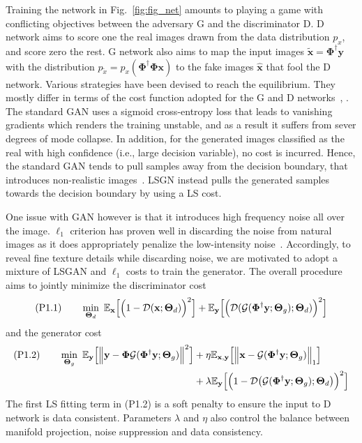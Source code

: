 \documentclass{journal}
\def \cD {\mathcal{D}}
\def \cG {\mathcal{G}}
\def \bPhi {\boldsymbol{\Phi}}
\def \bTheta {\boldsymbol{\Theta}}
\def \by {\mathbf{y}}
\def \bx {\mathbf{x}}
\begin{document}
Training the network in Fig.~\ref{fig:fig_net} amounts to playing a game with conflicting objectives between the adversary G and the discriminator D. D network aims to score one the real images drawn from the data distribution $p_{x}$, and score zero the rest. G network also aims to map the input images $\tilde{\bx}=\bPhi^{\dagger}\by$ with the distribution $p_{\tilde{x}}=p_{x}(\bPhi^{\dagger}\bPhi \bx)$ to the fake images $\hat{\bx}$ that fool the D network. Various strategies have been devised to reach the equilibrium. They mostly differ in terms of the cost function adopted for the G and D networks~\cite{gan-goodfellow2014}, \cite{lsgan2017}. The standard GAN uses a sigmoid cross-entropy loss that leads to vanishing gradients which renders the training unstable, and as a result it suffers from sever degrees of mode collapse. In addition, for the generated images classified as the real with high confidence (i.e., large decision variable), no cost is incurred. Hence, the standard GAN tends to pull samples away from the decision boundary, that introduces non-realistic images~\cite{lsgan2017}. LSGN instead pulls the generated samples towards the decision boundary by using a LS cost. 

One issue with GAN however is that it introduces high frequency noise all over the image. $\ell_1$ criterion has proven well in discarding the noise from natural images as it does appropriately penalize the low-intensity noise~\cite{lossfunction_zhao2017}. Accordingly, to reveal fine texture details while discarding noise, we are motivated to adopt a mixture of LSGAN and $\ell_1$ costs to train the generator. The overall procedure aims to jointly minimize the discriminator cost
%
\begin{align}
{\rm(P1.1)} \quad \quad \min_{\bTheta_d}~ \mathbb{E}_{\bx} \Big[\Big(1-\cD(\bx;\bTheta_d)\Big)^2\Big] +  \mathbb{E}_{\by} \Big[\Big(\cD(\cG(\bPhi^{\dagger} \by; \bTheta_g);\bTheta_d)\Big)^2\Big]  \nonumber
\end{align}
%
and the generator cost
%
\begin{align}
{\rm(P1.2)} \quad \quad \min_{\bTheta_g}~ \mathbb{E}_{\by}\Big[\Big\|\by - \bPhi \cG(\bPhi^{\dagger} \by; \bTheta_g) \Big\|^2 \Big] & + \eta \mathbb{E}_{\bx,\by}\Big[\Big\|\bx - \cG(\bPhi^{\dagger} \by; \bTheta_g) \Big\|_1 \Big]  \nonumber \\ & + \lambda \mathbb{E}_{\by} \Big[\Big(1-\cD \big(\cG(\bPhi^{\dagger} \by; \bTheta_g);\bTheta_d\big)\Big)^2\Big] \nonumber
\end{align}
%
The first LS fitting term in (P1.2) is a soft penalty to ensure the input to D network is data consistent. Parameters $\lambda$ and $\eta$ also control the balance between manifold projection, noise suppression and data consistency. 
\end{document}
